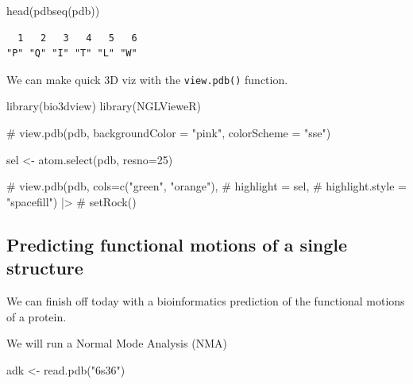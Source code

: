 \documentclass[
  letterpaper,
  DIV=11,
  numbers=noendperiod]{scrartcl}
\newenvironment{Shaded}{\begin{snugshade}}{\end{snugshade}}
\newcommand{\AttributeTok}[1]{\textcolor[rgb]{0.40,0.45,0.13}{#1}}
\newcommand{\CommentTok}[1]{\textcolor[rgb]{0.37,0.37,0.37}{#1}}
\newcommand{\DecValTok}[1]{\textcolor[rgb]{0.68,0.00,0.00}{#1}}
\newcommand{\FunctionTok}[1]{\textcolor[rgb]{0.28,0.35,0.67}{#1}}
\newcommand{\NormalTok}[1]{\textcolor[rgb]{0.00,0.23,0.31}{#1}}
\newcommand{\OtherTok}[1]{\textcolor[rgb]{0.00,0.23,0.31}{#1}}
\newcommand{\StringTok}[1]{\textcolor[rgb]{0.13,0.47,0.30}{#1}}
\begin{document}
\begin{Shaded}
\begin{Highlighting}[]
\FunctionTok{head}\NormalTok{(}\FunctionTok{pdbseq}\NormalTok{(pdb))}
\end{Highlighting}
\end{Shaded}

\begin{verbatim}
  1   2   3   4   5   6 
"P" "Q" "I" "T" "L" "W" 
\end{verbatim}

We can make quick 3D viz with the \texttt{view.pdb()} function.

\begin{Shaded}
\begin{Highlighting}[]
\FunctionTok{library}\NormalTok{(bio3dview)}
\FunctionTok{library}\NormalTok{(NGLVieweR)}

 \CommentTok{\# view.pdb(pdb, backgroundColor = "pink", colorScheme = "sse")}
\end{Highlighting}
\end{Shaded}

\begin{Shaded}
\begin{Highlighting}[]
\NormalTok{sel }\OtherTok{\textless{}{-}} \FunctionTok{atom.select}\NormalTok{(pdb, }\AttributeTok{resno=}\DecValTok{25}\NormalTok{)}

 \CommentTok{\# view.pdb(pdb, cols=c("green", "orange"),}
  \CommentTok{\#       highlight = sel,}
  \CommentTok{\#       highlight.style = "spacefill") |\textgreater{}}
 \CommentTok{\# setRock()}
\end{Highlighting}
\end{Shaded}

\subsection{Predicting functional motions of a single
structure}\label{predicting-functional-motions-of-a-single-structure}

We can finish off today with a bioinformatics prediction of the
functional motions of a protein.

We will run a Normal Mode Analysis (NMA)

\begin{Shaded}
\begin{Highlighting}[]
\NormalTok{adk }\OtherTok{\textless{}{-}} \FunctionTok{read.pdb}\NormalTok{(}\StringTok{"6s36"}\NormalTok{)}
\end{Highlighting}
\end{Shaded}
\end{document}
